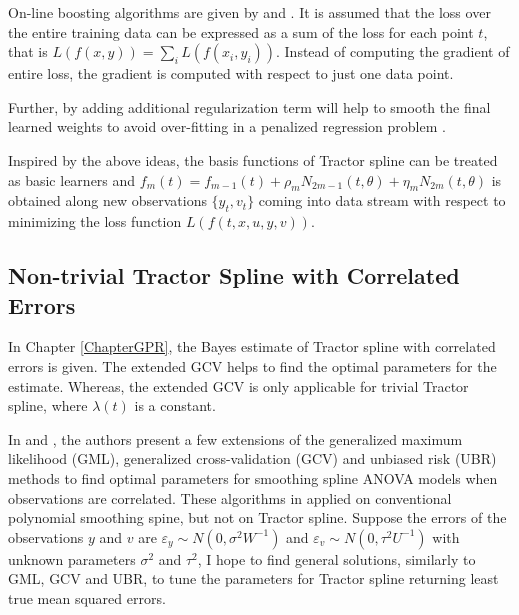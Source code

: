 On-line boosting algorithms are given by \cite{babenko2009family} and \cite{beygelzimer2015online}. It is assumed that the loss over the entire training data can be expressed as a sum of the loss for each point $t$, that is $L(f(x,y))=\sum_i L(f(x_i,y_i))$. Instead of computing the gradient of entire
loss, the gradient is computed with respect to just one data point. 

Further, by adding additional regularization term will help to smooth the final learned weights to avoid over-fitting in a penalized regression problem \cite{chen2016xgboost}. 

Inspired by the above ideas, the basis functions of Tractor spline can be treated as basic learners and $f_m(t)=f_{m-1}(t)+\rho_m N_{2m-1}(t,\theta)+\eta_mN_{2m}(t,\theta)$ is obtained along new observations $\{y_t,v_t\}$ coming into data stream with respect to minimizing the loss function $L(f(t,x,u,y,v))$. 



%



\subsection*{Non-trivial Tractor Spline with Correlated Errors}

In Chapter \ref{ChapterGPR}, the Bayes estimate of Tractor spline with correlated errors is given. The extended GCV helps to find the optimal parameters for the estimate. Whereas, the extended GCV is only applicable for trivial Tractor spline, where $\lambda(t)$ is a constant. 


In \cite{opsomer2001nonparametric} and \cite{wang1998smoothing}, the authors present a few extensions of the generalized maximum likelihood (GML), generalized cross-validation (GCV) and unbiased risk (UBR) methods to find optimal parameters for smoothing spline ANOVA models when observations are correlated. These algorithms in applied on conventional polynomial smoothing spine, but not on Tractor spline. Suppose the errors of the observations $y$ and $v$ are $\varepsilon_y\sim N(0,\sigma^2W^{-1})$ and $\varepsilon_v\sim N(0,\tau^2U^{-1})$ with unknown parameters $\sigma^2$ and $\tau^2$, I hope to find general solutions, similarly to GML, GCV and UBR, to tune the parameters for Tractor spline returning least true mean squared errors. 




